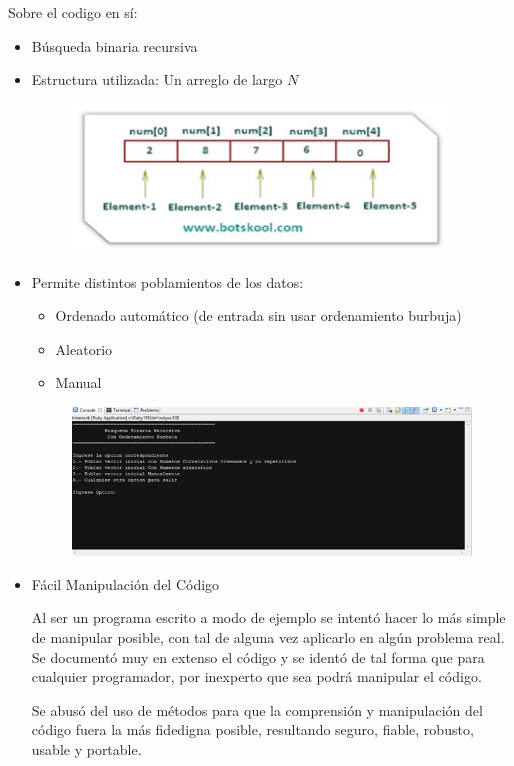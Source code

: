 Sobre el codigo en sí:
\begin{itemize}
\item Búsqueda binaria recursiva
\item Estructura utilizada: Un arreglo de largo $N$
\begin{figure}[h]
\centering
    \includegraphics[width=10cm]{imagen_1.png}
\end{figure}
\item Permite distintos poblamientos de los datos:
\begin{itemize}
\item Ordenado automático (de entrada sin usar ordenamiento burbuja)
\item Aleatorio
\item Manual
\end{itemize}
\begin{figure}[H]
\centering
    \includegraphics[width=\textwidth]{imagen_2.png}
\end{figure}

\item Fácil Manipulación del Código

Al ser un programa escrito a modo de ejemplo se intentó hacer lo más simple de manipular posible, con tal de alguna vez aplicarlo en algún problema real. Se documentó muy en extenso el código y se identó de tal forma que para cualquier programador, por inexperto que sea podrá manipular el código. 

Se abusó del uso de métodos para que la comprensión y manipulación del código fuera la más fidedigna posible, resultando seguro, fiable, robusto, usable y portable.


\end{itemize}
